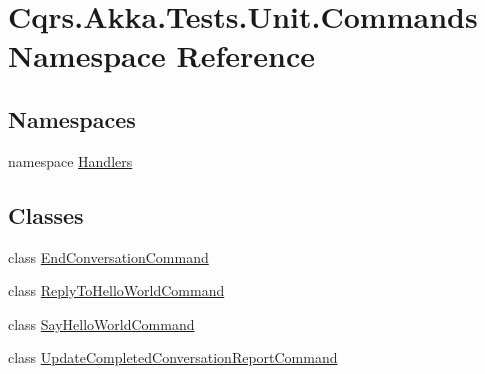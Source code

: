 \hypertarget{namespaceCqrs_1_1Akka_1_1Tests_1_1Unit_1_1Commands}{}\section{Cqrs.\+Akka.\+Tests.\+Unit.\+Commands Namespace Reference}
\label{namespaceCqrs_1_1Akka_1_1Tests_1_1Unit_1_1Commands}
\subsection*{Namespaces}
\begin{DoxyCompactItemize}
\item 
namespace \hyperlink{namespaceCqrs_1_1Akka_1_1Tests_1_1Unit_1_1Commands_1_1Handlers}{Handlers}
\end{DoxyCompactItemize}
\subsection*{Classes}
\begin{DoxyCompactItemize}
\item 
class \hyperlink{classCqrs_1_1Akka_1_1Tests_1_1Unit_1_1Commands_1_1EndConversationCommand}{End\+Conversation\+Command}
\item 
class \hyperlink{classCqrs_1_1Akka_1_1Tests_1_1Unit_1_1Commands_1_1ReplyToHelloWorldCommand}{Reply\+To\+Hello\+World\+Command}
\item 
class \hyperlink{classCqrs_1_1Akka_1_1Tests_1_1Unit_1_1Commands_1_1SayHelloWorldCommand}{Say\+Hello\+World\+Command}
\item 
class \hyperlink{classCqrs_1_1Akka_1_1Tests_1_1Unit_1_1Commands_1_1UpdateCompletedConversationReportCommand}{Update\+Completed\+Conversation\+Report\+Command}
\end{DoxyCompactItemize}
